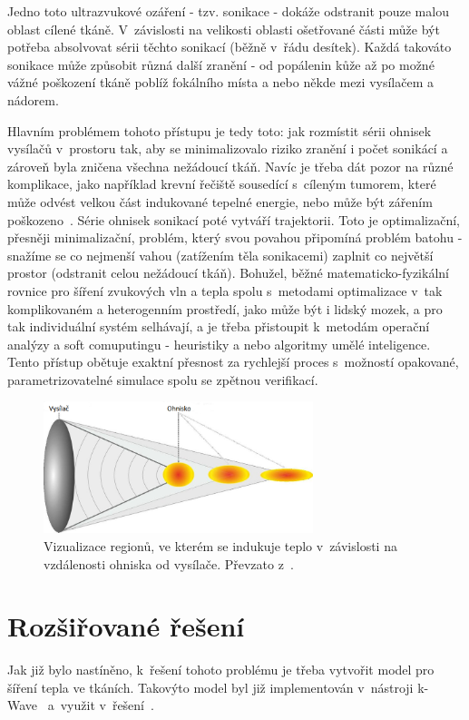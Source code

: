 Jedno toto ultrazvukové ozáření - tzv. sonikace - dokáže odstranit pouze malou oblast cílené tkáně. V~závislosti na velikosti oblasti ošetřované části může být potřeba absolvovat sérii těchto sonikací (běžně v~řádu desítek). Každá takováto sonikace může způsobit různá další zranění - od popálenin kůže až po možné vážné poškození tkáně poblíž fokálního místa a nebo někde mezi vysílačem a nádorem.

Hlavním problémem tohoto přístupu je tedy toto: jak rozmístit sérii ohnisek vysílačů v~prostoru tak, aby se minimalizovalo riziko zranění i počet sonikácí a zároveň byla zničena všechna nežádoucí tkáň. Navíc je třeba dát pozor na různé komplikace, jako například krevní řečiště sousedící s~cíleným tumorem, které může odvést velkou část indukované tepelné energie, nebo může být zářením poškozeno~\cite{BLOODOCCLUSION}. Série ohnisek sonikací poté vytváří trajektorii. Toto je optimalizační, přesněji minimalizační, problém, který svou povahou připomíná problém batohu - snažíme se co nejmenší vahou (zatížením těla sonikacemi) zaplnit co největší prostor (odstranit celou nežádoucí tkáň). Bohužel, běžné matematicko-fyzikální rovnice pro šíření zvukových vln a tepla spolu s~metodami optimalizace v~tak komplikovaném a heterogenním prostředí, jako může být i lidský mozek, a pro tak individuální systém selhávají, a je třeba přistoupit k~metodám operační analýzy a soft comuputingu - heuristiky a nebo algoritmy umělé inteligence. Tento přístup obětuje exaktní přesnost za rychlejší proces s~možností opakované, parametrizovatelné simulace spolu se zpětnou verifikací.



\begin{figure}[hbt]
	\centering
	\includegraphics[width=0.7\textwidth]{obrazky-figures/ohnisko.png}
	\caption{Vizualizace regionů, ve kterém se indukuje teplo v~závislosti na vzdálenosti ohniska od vysílače. Převzato z~\cite{FITPUB11696}.}
	\label{focalRegion}
\end{figure}

\section{Rozšiřované řešení}
\label{about:sec:existSolution}
Jak již bylo nastíněno, k~řešení tohoto problému je třeba vytvořit model pro šíření tepla ve tkáních. Takovýto model byl již implementován v~nástroji k-Wave~\cite{HIFUTHERMALMODEL} a~využit v~řešení~\cite{FITPUB11696}.

